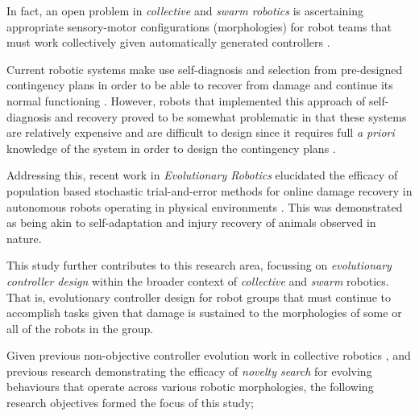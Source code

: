 In fact, an open problem in \textit{collective} \cite{KubeZhang1994B} and \textit{swarm robotics} \cite{Beni2004}
is ascertaining appropriate sensory-motor configurations (morphologies) for robot teams that must work collectively given automatically generated controllers \cite{FloreanoDurrMattiussi2008}.

Current robotic systems make use self-diagnosis and selection from pre-designed contingency plans in order to be able to recover from damage and continue its normal functioning \cite{fenton2001fault, verma2004real, BongardZykovLipson2006}. However, robots that implemented this approach of self-diagnosis and recovery proved to be somewhat problematic in that these systems are relatively expensive and are difficult to design since it requires full \textit{a priori} knowledge of the system in order to design the contingency plans \cite{CullyCluneTaraporeMouret2015}.













Addressing this, recent work in \textit{Evolutionary Robotics} elucidated the efficacy of population based stochastic trial-and-error methods for online damage recovery in autonomous robots operating in physical environments \cite{CullyCluneTaraporeMouret2015}.
This was demonstrated as being akin to self-adaptation and injury recovery of animals observed in nature.

This study further contributes to this research area, focussing on \textit{evolutionary controller design} \cite{FloreanoDurrMattiussi2008} within the broader context of \textit{collective} \cite{KubeZhang1994B} and \textit{swarm} \cite{Beni2004} robotics.
That is, evolutionary controller design for robot groups that must continue to accomplish tasks given that damage is sustained to the morphologies of some or all of the robots in the group.



Given previous non-objective controller evolution work in collective robotics
\cite{gomes2013generic}
\cite{RefWorks:5}
\cite{RefWorks:11},
and previous research demonstrating the efficacy of \textit{novelty search} \cite{lehman2011abandoning} for evolving behaviours that operate across various robotic morphologies, the following research objectives formed the focus of this study;

